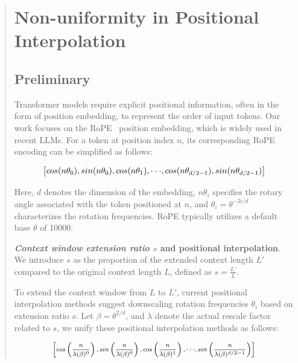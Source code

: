 \begin{abstract}
\section{Non-uniformity in Positional Interpolation}
\label{sec:analysis}

\subsection{Preliminary}

Transformer models require explicit positional information, often in the form of position embedding, to represent the order of input tokens. Our work focuses on the RoPE~\cite{rope} position embedding, which is widely used in recent  LLMs. For a token at position index $n$, its corresponding RoPE encoding can be simplified as follows:

\begin{equation}
		\fontsize{7.8}{7.8} \selectfont
	\label{eq:rope}
	\left[ cos(n\theta_0), sin(n\theta_0), cos(n\theta_1), \cdot\cdot\cdot, cos(n\theta_{d/2-1}), sin(n\theta_{d/2-1}) \right]   
\end{equation}

Here, $d$ denotes the dimension of the embedding, $n\theta_i$ specifies the rotary angle associated with the token positioned at $n$, and $\theta_i=\theta^{-2i/d}$ characterizes the rotation frequencies. RoPE typically utilizes a default base $\theta$ of 10000.

\textbf{\emph{Context window extension ratio $s$} and positional interpolation}. We introduce $s$ as the proportion of the extended context length $L'$ compared to the original context length $L$, defined as $s = \frac{L'}{L}$.

To extend the context window from $L$ to $L'$, current positional interpolation methods suggest downscaling rotation frequencies $\theta_i$ based on extension ratio $s$. Let $\beta=\theta^{2/d}$, and $\lambda$ denote the actual rescale factor related to $s$, we   unify these positional interpolation methods as follows:

\begin{equation}	
	\fontsize{7.5}{7.5} \selectfont
	\label{eq:unified_rope}
	\begin{aligned}
		\left[cos\left(\frac{n}{\lambda(\beta)^0}\right), sin \left(\frac{n}{\lambda(\beta)^0}\right), cos\left(\frac{n}{\lambda(\beta)^1}\right), \cdot\cdot\cdot,  sin \left(\frac{n}{\lambda(\beta)^{d/2-1}}\right) \right]   
	\end{aligned}
\end{equation}


\end{abstract}
